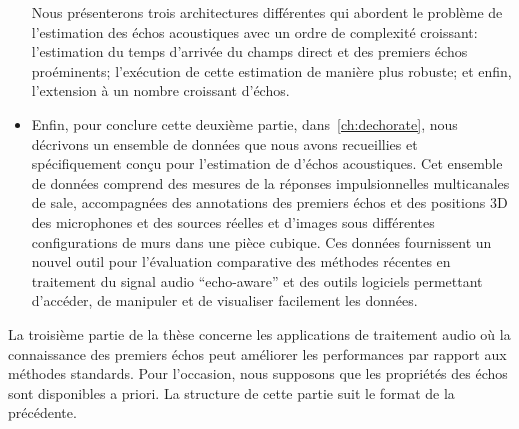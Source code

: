 \begin{itemize}
    Nous présenterons trois architectures différentes qui abordent le problème de l'estimation des échos acoustiques avec un ordre de complexité croissant:
    l'estimation du temps d'arrivée du champs direct et des premiers échos proéminents;
    l'exécution de cette estimation de manière plus robuste;
    et enfin, l'extension à un nombre croissant d'échos.
    \item
    Enfin, pour conclure cette deuxième partie, dans~\ref{ch:dechorate}, nous décrivons un ensemble de données que nous avons recueillies et spécifiquement conçu pour l'estimation de d'échos acoustiques.
    Cet ensemble de données comprend des mesures de la réponses impulsionnelles multicanales de sale, accompagnées des annotations des premiers échos et des positions 3D des microphones et des sources réelles et d'images sous différentes configurations de murs dans une pièce cubique.
    Ces données fournissent un nouvel outil pour l'évaluation comparative des méthodes récentes en traitement du signal audio ``echo-aware'' et des outils logiciels permettant d'accéder, de manipuler et de visualiser facilement les données.
\end{itemize}

La troisième partie de la thèse concerne les applications de traitement audio où la connaissance des premiers échos peut améliorer les performances par rapport aux méthodes standards.
Pour l'occasion, nous supposons que les propriétés des échos sont disponibles a priori.
La structure de cette partie suit le format de la précédente.

